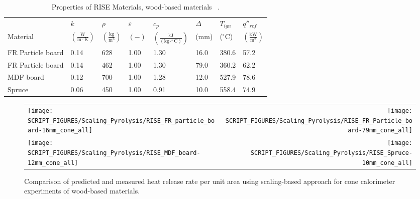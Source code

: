 \clearpage

\begin{table}[!h]
\caption[Properties of RISE Materials, wood-based materials]{Properties of RISE Materials, wood-based materials ~\cite{RISE:Fire_Database}.}
\centering
\begin{tabular}{|p{5.5cm}|p{1.0cm}|p{1.0cm}|p{0.8cm}|p{1.4cm}|p{1.0cm}|p{1.0cm}|p{1.2cm}|}
\hline
                                               & $k$    & $\rho$      & $\varepsilon$   & $c_{p}$ & $\Delta$    & $T_{ign}$ & $q''_{ref}$ \\
Material                                       & $\mathrm{\left(\frac{W}{m\cdot K}\right)}$ & $\mathrm{\left(\frac{kg}{m^{3}}\right)}$ & $\mathrm{( - )}$ & $\mathrm{\left(\frac{kJ}{(kg\cdot ^{\circ}C)}\right)}$ &  ($\mathrm{mm}$)   & ($\mathrm{^{\circ}C}$) & $\mathrm{\left(\frac{kW}{m^{2}}\right)}$ \\ \hline
\hline
FR Particle board & 0.14 & 628 & 1.00 & 1.30 & 16.0 & 380.6 & 57.2 \\ \hline
FR Particle board & 0.14 & 462 & 1.00 & 1.30 & 79.0 & 360.2 & 62.2 \\ \hline
MDF board & 0.12 & 700 & 1.00 & 1.28 & 12.0 & 527.9 & 78.6 \\ \hline
Spruce & 0.06 & 450 & 1.00 & 0.91 & 10.0 & 558.4 & 74.9 \\ \hline
\end{tabular}
\label{Properties_RISE_Materials_woods}
\end{table}

\begin{figure}[!h]
\begin{tabular*}{\textwidth}{l@{\extracolsep{\fill}}r}
\texttt{[image: SCRIPT\_FIGURES/Scaling\_Pyrolysis/RISE\_FR\_particle\_board-16mm\_cone\_all]} &
\texttt{[image: SCRIPT\_FIGURES/Scaling\_Pyrolysis/RISE\_FR\_Particle\_board-79mm\_cone\_all]} \\
\texttt{[image: SCRIPT\_FIGURES/Scaling\_Pyrolysis/RISE\_MDF\_board-12mm\_cone\_all]} &
\texttt{[image: SCRIPT\_FIGURES/Scaling\_Pyrolysis/RISE\_Spruce-10mm\_cone\_all]} \\
\end{tabular*}
\caption[HRRPUA of RISE materials using scaling model, wood-based materials]
{Comparison of predicted and measured heat release rate per unit area using scaling-based approach for cone calorimeter experiments of wood-based materials.}
\label{RISE_Materials_woods1}
\end{figure}

\clearpage


